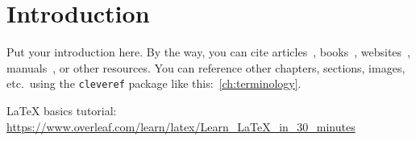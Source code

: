 \chapter*{Introduction}

Put your introduction here. By the way, you can cite articles~\cite{moore_hard_tiling}, books~\cite{golomb_polyomino_book}, websites~\cite{cadical_github}, manuals~\cite{sage}, or other resources. You can reference other chapters, sections, images, etc.\ using the \texttt{cleveref} package like this:~\cref{ch:terminology}.

\LaTeX{} basics tutorial: \url{https://www.overleaf.com/learn/latex/Learn_LaTeX_in_30_minutes}
